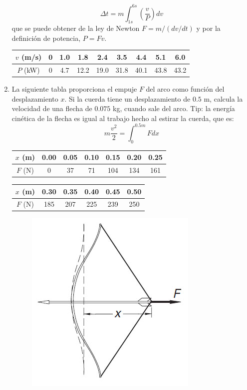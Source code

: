 \documentclass[11pt]{article}
\begin{document}
\begin{enumerate}
\[ \Delta t = m \int_{1s}^{6s} \left( \dfrac{v}{P} \right) dv\]
que se puede obtener de la ley de Newton $F= m/(dv/dt)$ y por la definición de potencia, $P=Fv$.
\begin{center}
\begin{tabular}{c | c | c | c | c | c | c | c | c}
$v$ (m/s) & 0 & 1.0 & 1.8 & 2.4 & 3.5 & 4.4 & 5.1 & 6.0 \\ \hline
$P$ (kW)  & 0 & 4.7 & 12.2 & 19.0 & 31.8 & 40.1 & 43.8 & 43.2 
\end{tabular}
\end{center}
\item La siguiente tabla proporciona el empuje $F$ del arco como función del desplazamiento $x$. Si la cuerda tiene un desplazamiento de $0.5$ m, calcula la velocidad de una flecha de $0.075$ kg, cuando sale del arco. Tip: la energía cinética de la flecha es igual al trabajo hecho al estirar la cuerda, que es:
\[ m \dfrac{v^{2}}{2} = \int_{0}^{0.5m} F dx\]
\begin{center}
\begin{tabular}{c | c | c | c | c | c | c |}
$x$ (m) & 0.00 & 0.05 & 0.10 & 0.15 & 0.20 & 0.25  \\ \hline
$F$ (N)  & 0 & 37 & 71 & 104 & 134 & 161
\end{tabular}
\end{center}
\begin{center}
\begin{tabular}{c | c | c | c | c | c | }
$x$ (m) & 0.30 & 0.35 & 0.40 & 0.45 & 0.50 \\ \hline
$F$ (N)  & 185 & 207 & 225 & 239 & 250 
\end{tabular}
\end{center}
\begin{figure}[H]
	\centering
	\includegraphics[scale=0.5]{Imagenes/Integral_01_Arco.jpg} 

\end{figure}
\end{enumerate}
\end{document}
